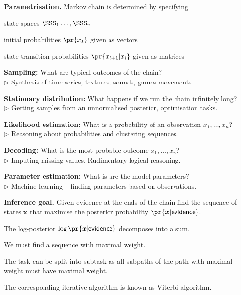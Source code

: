 \documentclass[landscape,footrule]{foils}
\renewcommand{\vec}[1]{\boldsymbol{#1}}
\begin{document}
\vspace*{1cm}

\textbf{Parametrisation.}
Markov chain is determined by specifying 

\begin{triangles}
\item state spaces $\SSS_1\ldots,\SSS_n$
\item initial probabilities $\pr{x_1}$ given as vectors 
\item state transition probabilities $\pr{x_{i+1}|x_{i}}$ given as matrices
\end{triangles}


\textbf{Sampling:} What are typical outcomes of the chain?\\
$\triangleright$ Synthesis of time-series, textures, sounds, games movements. 
\vspace*{1.5ex} 

\textbf{Stationary distribution:} What happens if we run the chain infinitely long?\\
$\triangleright$ Getting samples from an unnormalised posterior, optimisation tasks. 
\vspace*{1.5ex}  

\textbf{Likelihood estimation:} What is a probability of an observation $x_1,\ldots,x_n$?\\
$\triangleright$ Reasoning about probabilities and clustering sequences.
\vspace*{1.5ex} 

\textbf{Decoding:} What is the most probable outcome $x_1,\ldots,x_n$?\\ 
$\triangleright$ Imputing missing values. Rudimentary logical reasoning. 
\vspace*{1.5ex} 

\textbf{Parameter estimation:} What is are the model parameters?\\
$\triangleright$ Machine learning -- finding parameters based on observations.



\textbf{Inference goal.}
Given evidence at the ends of the chain find the sequence of states $\vec{x}$ that maximise the posterior probability $\pr{\vec{x}|\mathsf{evidence}}$.
\begin{triangles}
\item The log-posterior $\log\pr{\vec{x}|\mathsf{evidence}}$ decomposes into a sum.
\item We must find a sequence with maximal weight.
\item The task can be split into subtask as all subpaths of the path with maximal weight must have maximal weight. 
\item The corresponding iterative algorithm is known as Viterbi algorithm.
\end{triangles}
\end{document}
